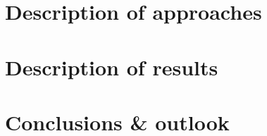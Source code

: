 \documentclass[12pt]{article}
\begin{document}






\section{Description of approaches}







\section{Description of results}







\section{Conclusions \& outlook}










\end{document}
